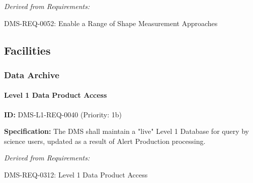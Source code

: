 \documentclass[SE,toc,lsstdraft]{lsstdoc}
\newcommand{\addendum}{}
\begin{document}
\emph{Derived from Requirements:}

DMS-REQ-0052:
Enable a Range of Shape Measurement Approaches \newline

\subsection{Facilities}

\subsubsection{Data Archive}

\paragraph{Level 1 Data Product Access}\hfill  %

\label{DMS-L1-REQ-0040}
\textbf{ID:} DMS-L1-REQ-0040 (Priority: 1b)

\textbf{Specification:} The DMS shall maintain a "live" Level 1 Database for query by science users, updated as a result of Alert Production processing.

\emph{Derived from Requirements:}

DMS-REQ-0312:
Level 1 Data Product Access \newline

\addendum


\end{document}
